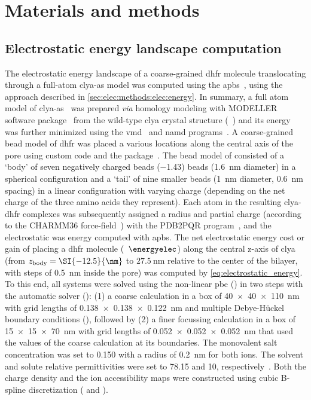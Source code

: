 %
\section{Materials and methods}
%
\label{sec:trapping:methods}
%

\subsection{Electrostatic energy landscape computation}
%
The electrostatic energy landscape of a coarse-grained \gls{dhfr} molecule translocating through a full-atom
\gls{clya-as} model was computed using the \gls{apbs}~\cite{Baker-2001}, using the approach described in
\cref{sec:elec:methods:elec:energy}. In summary, a full atom model of \gls{clya-as}~\cite{Franceschini-2016}
was prepared \textit{via} homology modeling with MODELLER software package~\cite{Sali-1993} from the wild-type
\gls{clya} crystal structure (~\cite{Mueller-2009}) and its energy was further minimized using the
\gls{vmd}~\cite{Humphrey-1996} and \gls{namd} programs~\cite{Phillips-2005}. A coarse-grained bead model of
\gls{dhfr} was placed a various locations along the central axis of the pore using custom  code
and the  package~\cite{Cock-2009}. The bead model of \DHFRt{} consisted of a `body' of seven
negatively charged beads  (\SI{-1.43}{\ec}) beads (\SI{1.6}{\nm} diameter) in a spherical configuration and a
`tail' of nine smaller beads (\SI{1}{\nm} diameter, \SI{0.6}{\nm} spacing) in a linear configuration with
varying charge (depending on the net charge of the three amino acids they represent). Each atom in the
resulting \gls{clya}-\gls{dhfr} complexes was subsequently assigned a radius and partial charge (according to
the CHARMM36 force-field~\cite{Huang-2013}) with the PDB2PQR program~\cite{Dolinsky-2004,Dolinsky-2007}, and
the electrostatic was energy computed with \gls{apbs}. The net electrostatic energy cost or gain of placing a
\gls{dhfr} molecule (\ie~$\energyelec$) along the central z-axis of \gls{clya} (from
$z_{\rm{body}}=\SI{-12.5}{\nm}$ to $\SI{27.5}{\nm}$ relative to the center of the bilayer, with steps of
\SI{0.5}{\nm} inside the pore) was computed by \cref{eq:electrostatic_energy}. To this end, all systems were
solved using the non-linear \gls{pbe} () in two steps with the automatic solver ():
(1) a coarse calculation in a box of \SI{40x40x110}{\nm} with grid lengths of \SI{0.138x0.138x0.122}{\nm} and
multiple Debye-H\"{u}ckel boundary conditions (), followed by (2) a finer focussing calculation
in a box of \SI{15x15x70}{\nm} with grid lengths of \SI{0.052x0.052x0.052}{\nm} that used the values of the
coarse calculation at its boundaries. The monovalent salt concentration was set to \SI{0.150}{\Molar} with a
radius of \SI{0.2}{\nm} for both ions. The solvent and solute relative permittivities were set to \num{78.15}
and \num{10}, respectively~\cite{Li-2013}. Both the charge density and the ion accessibility maps were
constructed using cubic B-spline discretization ( and ).


